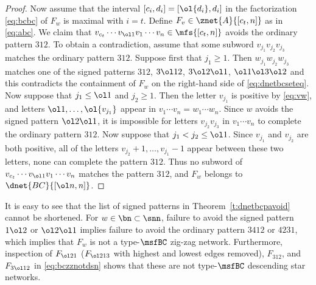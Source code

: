 \begin{proof}
  Now assume that the interval $[c_i,d_i] = [\ol{d_i},d_i]$
  in the factorization \eqref{eq:bcbc} of $F_w$
  is maximal with $i=t$.
  Define $F_v \in \znet{A}{[c_t,n]}$ as in \eqref{eq:abc}.
  We claim that
  $v_{c_t} \cdots v_{\ol 1} v_1 \cdots v_n \in \mfs{[c_t,n]}$
  avoids the ordinary pattern $312$.
  To obtain a contradiction,
  assume that some subword
  $v_{j_1} v_{j_2} v_{j_3}$
  matches the ordinary pattern $312$.
  Suppose first that $j_1 \geq 1$. Then 
  $w_{j_1} w_{j_2} w_{j_3}$
  matches one of the signed patterns $312$, $3\ol12$, $3\ol2\ol1$,
  $\ol1\ol3\ol2$ and this contradicts the containment of $F_w$ on the
  right-hand side of \eqref{eq:dnetbcseteq}.
  Now suppose that $j_1 \leq \ol 1$ and $j_2 \geq 1$.
  Then the letter $v_{j_1}$ is positive by \eqref{eq:vw},
  and letters $\ol1, \dotsc, \ol{v_{j_1}}$ appear in
  $v_1 \cdots v_n = w_1 \cdots w_n$.
  Since $w$ avoids the signed pattern $\ol2\ol1$, it is  
  impossible for
  letters $v_{j_2}v_{j_3}$ in $v_1 \cdots v_n$
  to complete the ordinary pattern $312$.
  Now suppose that $j_1 < j_2 \leq \ol 1$.
  Since $v_{j_1}$ and $v_{j_2}$ are both positive,
  all of the letters $v_{j_2} + 1, \dotsc, v_{j_1}-1$ appear between
  these two letters, none can complete the pattern $312$.
  Thus no subword of $v_{c_t} \cdots v_{\ol 1} v_1 \cdots v_n$ matches
  the pattern $312$, and
  $F_w$ belongs to $\dnet{BC}{[\ol n, n]}$.
\end{proof}
It is easy to see that the list of signed patterns in
Theorem~\ref{t:dnetbcpavoid} cannot be shortened.
For $w \in \bn \subset \snn$,
failure to avoid the signed pattern $1 \ol2$ or $\ol2\ol1$
implies failure to avoid the ordinary pattern $3412$ or $4231$,
which implies that $F_w$ is not a type-$\msfBC$ zig-zag network.
Furthermore, inspection of $F_{\ol21}$
($F_{\ol213}$ with highest and lowest edges removed),
$F_{312}$, and $F_{\smash{3\ol12}}$ in \eqref{eq:bczznotdsn}
shows that these are not type-$\msfBC$ descending star networks.

